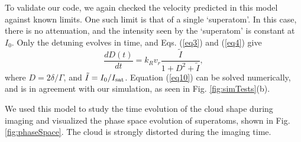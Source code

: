 \documentclass[12pt]{iopart}
\begin{document}
\par To validate our code, we again checked the velocity predicted in this model against known limits. One such limit is that of a single `superatom'. In this case, there is no attenuation, and the intensity seen by the `superatom' is constant at $I_0$. Only the detuning  evolves in time, and Eqs. (\ref{eq3}) and (\ref{eq4}) give
\begin{equation}
\frac{dD(t)}{dt}= k_R v_r \frac{\tilde{I}}{1+D^2+\tilde{I}},
\label{eq10}
\end{equation}
where $D = 2\delta/\Gamma$, and $\tilde{I} = I_0/I_{\rm{sat}}$. Equation (\ref{eq10}) can be solved numerically, and is in agreement with our simulation, as seen in Fig. \ref{fig:simTests}(b).
\par We used this model to study the time evolution of the cloud shape during imaging and visualized the phase space evolution of superatoms, shown in Fig. \ref{fig:phaseSpace}. The cloud is strongly distorted during the imaging time.
\end{document}
